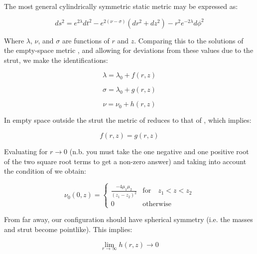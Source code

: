 \documentclass{article}
\begin{document}
The most general cylindrically symmetric static metric may be expressed as:

\begin{equation}
ds^{2}=e^{2\lambda}dt^{2}-e^{2\left(\nu-\sigma\right)}\left(dr^{2}+dz^{2}\right)-r^{2}e^{-2\lambda}d\phi^{2}
\label{eq:weyl-metric}
\end{equation}

Where $\lambda$, $\nu$, and $\sigma$ are functions of $r$ and $z$. Comparing this to the solutions of the empty-space metric , and allowing for deviations from these values due to the strut, we make the identifications:

\begin{equation}
	\label{eq:lambda-matter}
	\lambda=\lambda_0 + f(r,z)
\end{equation}

\begin{equation}
	\label{eq:sigma-matter}
	\sigma=\lambda_0 + g(r,z)
\end{equation}

\begin{equation}
	\label{eq:nu-matter}
	\nu=\nu_0 + h(r,z)
\end{equation}

In empty space outside the strut the metric of  reduces to that of  , which implies:

\begin{equation}
	\label{eq:f=g}
	f(r,z)=g(r,z)
\end{equation}

Evaluating  for $r\rightarrow 0$ (n.b. you must take the one negative and one positive root of the two square root terms to get a non-zero answer) and taking into account the condition of  we obtain:

\begin{equation}
\label{eq:nu_r=0}
\nu_0 (0,z) = \left\{  \begin{array}{cl}\frac{-4\mu_{1}\mu_{2}}{\left(z_{1}-z_{2}\right)^{2}} & \mbox{for}\quad  z_{1}<z<z_{2} \\ 0 & \mbox{otherwise}\end{array}\right. 
\end{equation}

From far away, our configuration should have spherical symmetry (i.e. the masses and strut become pointlike). This implies:

\begin{equation}
	\label{eq:h-limit}
	\lim_{r\rightarrow \infty} h(r,z)\rightarrow 0
\end{equation}
\end{document}
